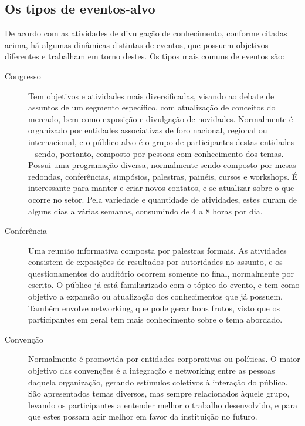 \documentclass[12pt,a4paper,twoside,hyphens,english,brazil]{abntex2}
\begin{document}
\subsection{Os tipos de eventos-alvo} \label{sec:eventos}
De acordo com as atividades de divulgação de conhecimento, conforme citadas acima, há algumas dinâmicas distintas de eventos, que possuem objetivos diferentes e trabalham em torno destes. Os tipos mais comuns de eventos são\cite{tipos-manager}\cite{tipos-parlante}\cite{dicionario}\cite{dicas-feira-de-negocios}:

\begin{description}
	\item[Congresso] Tem objetivos e atividades mais diversificadas, visando ao debate de assuntos de um segmento específico, com atualização de conceitos do mercado, bem como exposição e divulgação de novidades. Normalmente é organizado por entidades associativas de foro nacional, regional ou internacional, e o público-alvo é o grupo de participantes destas entidades -- sendo, portanto, composto por pessoas com conhecimento dos temas. Possui uma programação diversa, normalmente sendo composto por mesas-redondas, conferências, simpósios, palestras, painéis, cursos e workshops. É interessante para manter e criar novos contatos, e se atualizar sobre o que ocorre no setor. Pela variedade e quantidade de atividades, estes duram de alguns dias a várias semanas, consumindo de 4 a 8 horas por dia.
	
	\item[Conferência] Uma reunião informativa composta por palestras formais. As atividades consistem de exposições de resultados por autoridades no assunto, e os questionamentos do auditório ocorrem somente no final, normalmente por escrito. O público já está familiarizado com o tópico do evento, e tem como objetivo a expansão ou atualização dos conhecimentos que já possuem. Também envolve networking, que pode gerar bons frutos, visto que os participantes em geral tem mais conhecimento sobre o tema abordado. %
							
	\item[Convenção] Normalmente é promovida por entidades corporativas ou políticas. O maior objetivo das convenções é a integração e networking entre as pessoas daquela organização, gerando estímulos coletivos à interação do público. São apresentados temas diversos, mas sempre relacionados àquele grupo, levando os participantes a entender melhor o trabalho desenvolvido, e para que estes possam agir melhor em favor da instituição no futuro.
	

\end{description}
\end{document}
